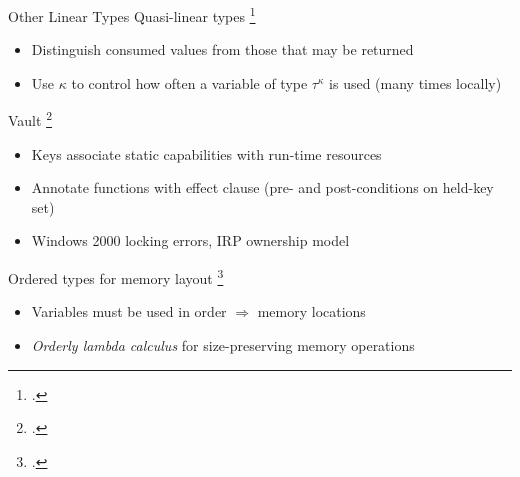 \documentclass[aspectratio=169]{beamer}
\begin{document}
\begin{frame}{Other Linear Types}
  Quasi-linear types \footcite{kobayashi_quasi-linear_1999}
    \vspace{-0.09in}
    \begin{itemize}
        \item Distinguish consumed values from those that may be returned
        \item Use $\kappa$ to control how often a variable of type $\tau^{\kappa}$ is used (many times locally)
    \end{itemize}
\pause
  Vault \footcite{deline_enforcing_2001}
    \vspace{-0.09in}
    \begin{itemize}
        \item Keys associate static capabilities with run-time resources %
        \item Annotate functions with effect clause (pre- and post-conditions on held-key set)
        \item Windows 2000 locking errors, IRP ownership model %
    \end{itemize}
\pause
  Ordered types for memory layout \footcite{petersen_type_2003}
    \vspace{-0.09in}
    \begin{itemize}
        \item Variables must be used in order $\Rightarrow$ memory locations 
        \item \emph{Orderly lambda calculus} for size-preserving memory operations 
    \end{itemize}
  \vspace{0.2in}
\end{frame}
\end{document}

